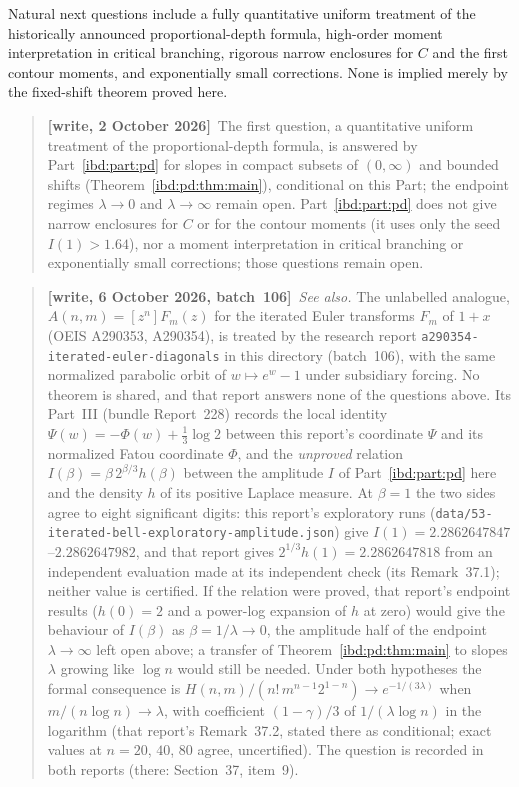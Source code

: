 \documentclass[11pt,letterpaper]{article}
\theoremstyle{remark}\newtheorem{remark}[theorem]{Remark}
\newenvironment{writenote}{\par\smallskip\begin{quote}\small\textbf{[write, 2 October 2026]}\ }{\end{quote}\smallskip}
\newcommand{\repopath}[1]{\nolinkurl{#1}}
\begin{document}
Natural next questions include a fully quantitative uniform treatment of the historically announced proportional-depth formula, high-order moment interpretation in critical branching, rigorous narrow enclosures for $C$ and the first contour moments, and exponentially small corrections. None is implied merely by the fixed-shift theorem proved here.
\begin{writenote}The first question, a quantitative uniform treatment of the proportional-depth formula, is answered by Part~\ref{ibd:part:pd} for slopes in compact subsets of $(0,\infty)$ and bounded shifts (Theorem~\ref{ibd:pd:thm:main}), conditional on this Part; the endpoint regimes $\lambda\to0$ and $\lambda\to\infty$ remain open. Part~\ref{ibd:part:pd} does not give narrow enclosures for $C$ or for the contour moments (it uses only the seed $I(1)>1.64$), nor a moment interpretation in critical branching or exponentially small corrections; those questions remain open.\end{writenote}
\par\smallskip\begin{quote}\small\textbf{[write, 6 October 2026, batch~106]}\ \emph{See also.} The unlabelled analogue, $A(n,m)=[z^n]F_m(z)$ for the iterated Euler transforms $F_m$ of $1+x$ (OEIS A290353, A290354), is treated by the research report \repopath{a290354-iterated-euler-diagonals} in this directory (batch~106), with the same normalized parabolic orbit of $w\mapsto e^w-1$ under subsidiary forcing. No theorem is shared, and that report answers none of the questions above. Its Part~III (bundle Report~228) records the local identity $\Psi(w)=-\Phi(w)+\frac13\log2$ between this report's coordinate $\Psi$ and its normalized Fatou coordinate $\Phi$, and the \emph{unproved} relation $I(\beta)=\beta\,2^{\beta/3}h(\beta)$ between the amplitude $I$ of Part~\ref{ibd:part:pd} here and the density $h$ of its positive Laplace measure. At $\beta=1$ the two sides agree to eight significant digits: this report's exploratory runs (\texttt{data/53-iterated-bell-exploratory-amplitude.json}) give $I(1)=2.2862647847$--$2.2862647982$, and that report gives $2^{1/3}h(1)=2.2862647818$ from an independent evaluation made at its independent check (its Remark~37.1); neither value is certified. If the relation were proved, that report's endpoint results ($h(0)=2$ and a power-log expansion of $h$ at zero) would give the behaviour of $I(\beta)$ as $\beta=1/\lambda\to0$, the amplitude half of the endpoint $\lambda\to\infty$ left open above; a transfer of Theorem~\ref{ibd:pd:thm:main} to slopes $\lambda$ growing like $\log n$ would still be needed. Under both hypotheses the formal consequence is $H(n,m)/(n!\,m^{n-1}2^{1-n})\to e^{-1/(3\lambda)}$ when $m/(n\log n)\to\lambda$, with coefficient $(1-\gamma)/3$ of $1/(\lambda\log n)$ in the logarithm (that report's Remark~37.2, stated there as conditional; exact values at $n=20$, $40$, $80$ agree, uncertified). The question is recorded in both reports (there: Section~37, item~9).\end{quote}\smallskip
\end{document}
